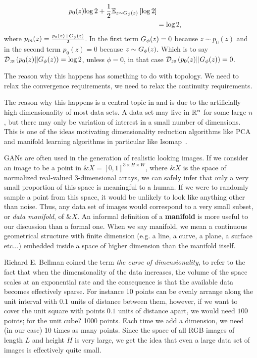 \begin{example}
\begin{enumerate}[(i)]
\begin{align}
{                                                                  p_0(z)}{\log{2}} + {1 \over 2} \mathbb{E}_{z \sim G_\phi(z)}\left[ \log{2} \right] \\ & =
                                                                                                                                \log{2},
    \end{align}
    where $p_m(z) = {p_0(z) + G_\phi(z) \over 2}$. In the first term
    $G_\phi(z) = 0$ because $z \sim p_0(z)$ and in the second term
    $p_0(z) = 0$ because $z \sim G_\phi(z)$. Which is to say
    $\mathcal{D}_{\text{\tiny JS}}\left(p_0(z)\middle|\middle|G_\phi(z)\right) = \log{2}$, unless $\phi = 0$, in that case
    $\mathcal{D}_{\text{\tiny JS}}\left(p_0(z)\middle|\middle|G_\phi(z)\right) = 0$.
  \end{enumerate}
\end{example}

The reason why this happens has something to do with topology. We need
to relax the convergence requirements, we need to relax the continuity
requirements.

The reason why this happens is a central topic in
\cite{ref:arjovsky-towards-2017} and is due to the artificially high
dimensionality of most data sets. A data set may live in $\mathbb{R}^n$ for
some large $n$, but there may only be variation of interest in a small
number of dimensions. This is one of the ideas motivating
dimensionality reduction algorithms like PCA and manifold learning
algorithms in particular like Isomap~\cite{ref:tenenbaum-2000}.

GANs are often used in the generation of realistic looking images. If
we consider an image to be a point in $\&X = [0, 1]^{3 \times H \times
  W}$, where $\&X$ is the space of normalized real-valued 3-dimensional
arrays, we can safely infer that only a very small proportion of this
space is meaningful to a human.  If we were to randomly sample a point
from this space, it would be unlikely to look like anything other than
noise. Thus, any data set of images would correspond to a very small
subset, or \textit{data manifold}, of $\&X$. An informal definition of
a \textbf{manifold} is more useful to our discussion than a formal
one. When we say manifold, we mean a continuous geometrical structure
with finite dimension (e.g. a line, a curve, a plane, a surface
etc...) embedded inside a space of higher dimension than the manifold
itself.

Richard E. Bellman coined the term \textit{the curse of
  dimensionality}, to refer to the fact that when the dimensionality of
the data increases, the volume of the space scales at an exponential
rate and the consequence is that the available data becomes
effectively sparse. For instance $10$ points can be evenly arrange
along the unit interval with $0.1$ units of distance between them,
however, if we want to cover the unit square with points $0.1$ units
of distance apart, we would need $100$ points; for the unit cube? 1000
points. Each time we add a dimension, we need (in our case) 10 times
as many points. Since the space of all RGB images of length $L$ and
height $H$ is very large, we get the idea that even a large data set
of images is effectively quite small.

